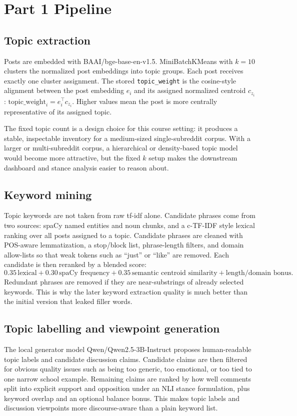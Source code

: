 \documentclass[11pt]{article}
\begin{document}
        \section*{Part 1 Pipeline}
        \subsection*{Topic extraction}
        Posts are embedded with BAAI/bge-base-en-v1.5. MiniBatchKMeans with $k=10$ clusters the normalized post embeddings into topic groups. Each post receives exactly one cluster assignment. The stored \texttt{topic\_weight} is the cosine-style alignment between the post embedding $e_i$ and its assigned normalized centroid $c_{z_i}$: $\text{topic\_weight}_i = e_i^\top c_{z_i}$. Higher values mean the post is more centrally representative of its assigned topic.

        The fixed topic count is a design choice for this course setting: it produces a stable, inspectable inventory for a medium-sized single-subreddit corpus. With a larger or multi-subreddit corpus, a hierarchical or density-based topic model would become more attractive, but the fixed $k$ setup makes the downstream dashboard and stance analysis easier to reason about.

        \subsection*{Keyword mining}
        Topic keywords are not taken from raw tf-idf alone. Candidate phrases come from two sources: spaCy named entities and noun chunks, and a c-TF-IDF style lexical ranking over all posts assigned to a topic. Candidate phrases are cleaned with POS-aware lemmatization, a stop/block list, phrase-length filters, and domain allow-lists so that weak tokens such as ``just'' or ``like'' are removed. Each candidate is then reranked by a blended score:
        \[
        0.35\,\text{lexical} + 0.30\,\text{spaCy frequency} + 0.35\,\text{semantic centroid similarity} + \text{length/domain bonus}.
        \]
        Redundant phrases are removed if they are near-substrings of already selected keywords. This is why the later keyword extraction quality is much better than the initial version that leaked filler words.

        \subsection*{Topic labelling and viewpoint generation}
        The local generator model Qwen/Qwen2.5-3B-Instruct proposes human-readable topic labels and candidate discussion claims. Candidate claims are then filtered for obvious quality issues such as being too generic, too emotional, or too tied to one narrow school example. Remaining claims are ranked by how well comments split into explicit support and opposition under an NLI stance formulation, plus keyword overlap and an optional balance bonus. This makes topic labels and discussion viewpoints more discourse-aware than a plain keyword list.
\end{document}
